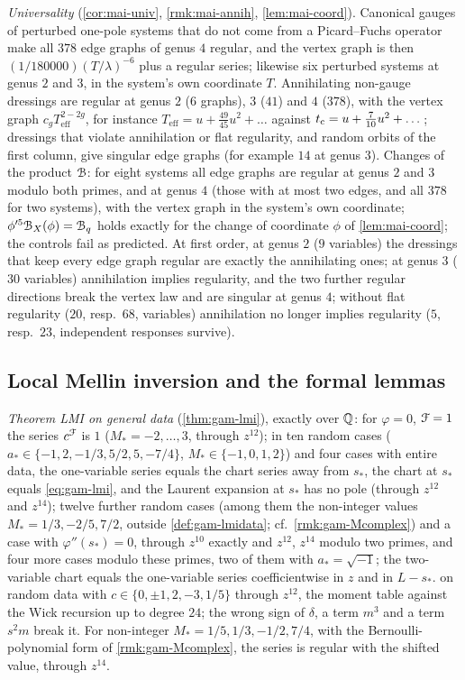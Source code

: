\emph{Universality} (\cref{cor:mai-univ}, \cref{rmk:mai-annih}, \cref{lem:mai-coord}). Canonical gauges of perturbed one-pole systems that do not come from a Picard--Fuchs operator make all $378$ edge graphs of genus $4$ regular, and the vertex graph is then $(1/180000)(T/\lambda)^{-6}$ plus a regular series; likewise six perturbed systems at genus $2$ and $3$, in the system's own coordinate $T$. Annihilating non-gauge dressings are regular at genus $2$ ($6$ graphs), $3$ ($41$) and $4$ ($378$), with the vertex graph $c_gT_{\mathrm{eff}}^{2-2g}$, for instance $T_{\mathrm{eff}}=u+\tfrac{49}{45}u^2+\dots$ against $t_{\mathrm{c}}=u+\tfrac{7}{10}u^2+\dots$; dressings that violate annihilation or flat regularity, and random orbits of the first column, give singular edge graphs (for example $14$ at genus $3$). Changes of the product $\mathcal{B}$: for eight systems all edge graphs are regular at genus $2$ and $3$ modulo both primes, and at genus $4$ (those with at most two edges, and all $378$ for two systems), with the vertex graph in the system's own coordinate; $\phi'^5\mathcal{B}_X(\phi)=\mathcal{B}_q$ holds exactly for the change of coordinate $\phi$ of \cref{lem:mai-coord}; the controls fail as predicted. At first order, at genus $2$ ($9$ variables) the dressings that keep every edge graph regular are exactly the annihilating ones; at genus $3$ ($30$ variables) annihilation implies regularity, and the two further regular directions break the vertex law and are singular at genus $4$; without flat regularity ($20$, resp.\ $68$, variables) annihilation no longer implies regularity ($5$, resp.\ $23$, independent responses survive).

\subsection{Local Mellin inversion and the formal lemmas}
\label{sec:evi-lmi}

\emph{Theorem LMI on general data} (\cref{thm:gam-lmi}), exactly over $\mathbb{Q}$: for $\varphi=0$, $\mathcal{F}=1$ the series $c^{\mathcal{F}}$ is $1$ ($M_*=-2,\dots,3$, through $z^{12}$); in ten random cases ($a_*\in\{-1,2,-1/3,5/2,5,-7/4\}$, $M_*\in\{-1,0,1,2\}$) and four cases with entire data, the one-variable series equals the chart series away from $s_*$, the chart at $s_*$ equals \eqref{eq:gam-lmi}, and the Laurent expansion at $s_*$ has no pole (through $z^{12}$ and $z^{14}$); twelve further random cases (among them the non-integer values $M_*=1/3,-2/5,7/2$, outside \cref{def:gam-lmidata}; cf.\ \cref{rmk:gam-Mcomplex}) and a case with $\varphi''(s_*)=0$, through $z^{10}$ exactly and $z^{12}$, $z^{14}$ modulo two primes, and four more cases modulo these primes, two of them with $a_*=\sqrt{-1}$; the two-variable chart equals the one-variable series coefficientwise in $z$ and in $L-s_*$.  on random data with $c\in\{0,\pm 1,2,-3,1/5\}$ through $z^{12}$, the moment table against the Wick recursion up to degree $24$; the wrong sign of $\delta$, a term $m^3$ and a term $s^2m$ break it. For non-integer $M_*=1/5,1/3,-1/2,7/4$, with the Bernoulli-polynomial form of \cref{rmk:gam-Mcomplex}, the series is regular with the shifted value, through $z^{14}$.


